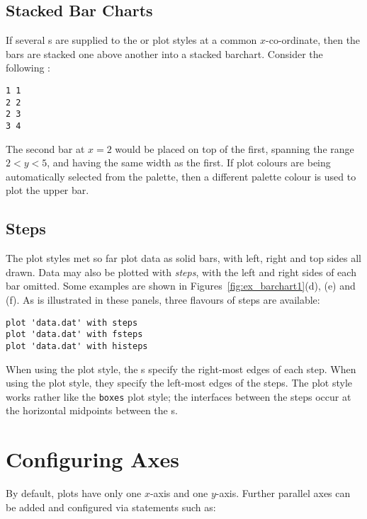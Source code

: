 \subsection{Stacked Bar Charts}

If several \datapoint s are supplied to the  or 
plot styles at a common $x$-co-ordinate, then the bars are stacked one above
another into a stacked barchart. Consider the following \datafile:

\begin{verbatim} 
1 1
2 2
2 3
3 4
\end{verbatim}

\noindent The second bar at $x=2$ would be placed on top of the first, spanning
the range $2<y<5$, and having the same width as the first. If plot colours are
being automatically selected from the palette, then a different palette colour
is used to plot the upper bar.

\subsection{Steps}

The plot styles met so far plot data as solid bars, with left, right and top
sides all drawn. Data may also be plotted with {\it steps}, with the left and
right sides of each bar omitted. Some examples are shown in
Figures~\ref{fig:ex_barchart1}(d), (e) and (f).  As is illustrated in these
panels, three flavours of steps are available:

\begin{verbatim}
plot 'data.dat' with steps 
plot 'data.dat' with fsteps 
plot 'data.dat' with histeps
\end{verbatim}

\noindent When using the  plot style, the \datapoint s specify the
right-most edges of each step. When using the  plot style, they
specify the left-most edges of the steps. The  plot style works
rather like the {\tt boxes} plot style; the interfaces between the steps occur
at the horizontal midpoints between the \datapoint s.

\section{Configuring Axes}
\label{sec:multiple_axes}

By default, plots have only one $x$-axis and one $y$-axis. Further parallel
axes can be added and configured via statements such as:

